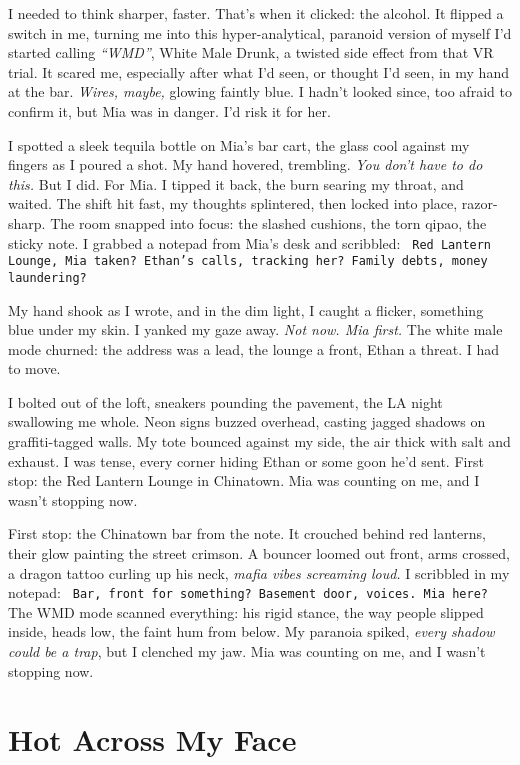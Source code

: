 \documentclass[12pt]{article}
\newcommand{\note}[1]{\texttt{\small \color{DarkGray} #1}}
\begin{document}
I needed to think sharper, faster. That’s when it clicked: the alcohol. It flipped a switch in me, turning me into this hyper-analytical, paranoid version of myself I’d started calling \textit{“WMD”}, White Male Drunk, a twisted side effect from that VR trial. It scared me, especially after what I’d seen, or thought I’d seen, in my hand at the bar. \textit{Wires, maybe,} glowing faintly blue. I hadn’t looked since, too afraid to confirm it, but \textnormal{Mia} was in danger. I’d risk it for her.

I spotted a sleek tequila bottle on \textnormal{Mia}’s bar cart, the glass cool against my fingers as I poured a shot. My hand hovered, trembling. \textit{You don’t have to do this.} But I did. For \textnormal{Mia}. I tipped it back, the burn searing my throat, and waited. The shift hit fast, my thoughts splintered, then locked into place, razor-sharp. The room snapped into focus: the slashed cushions, the torn qipao, the sticky note. I grabbed a notepad from \textnormal{Mia}’s desk and scribbled: \note{Red Lantern Lounge, Mia taken? Ethan’s calls, tracking her? Family debts, money laundering?}

My hand shook as I wrote, and in the dim light, I caught a flicker, something blue under my skin. I yanked my gaze away. \textit{Not now. Mia first.} The white male mode churned: the address was a lead, the lounge a front, \textnormal{Ethan} a threat. I had to move.

I bolted out of the loft, sneakers pounding the pavement, the LA night swallowing me whole. Neon signs buzzed overhead, casting jagged shadows on graffiti-tagged walls. My tote bounced against my side, the air thick with salt and exhaust. I was tense, every corner hiding \textnormal{Ethan} or some goon he’d sent. First stop: the Red Lantern Lounge in Chinatown. \textnormal{Mia} was counting on me, and I wasn’t stopping now.

First stop: the Chinatown bar from the note. It crouched behind red lanterns, their glow painting the street crimson. A bouncer loomed out front, arms crossed, a dragon tattoo curling up his neck, \textit{mafia vibes screaming loud.} I scribbled in my notepad: \note{Bar, front for something? Basement door, voices. Mia here?} The WMD mode scanned everything: his rigid stance, the way people slipped inside, heads low, the faint hum from below. My paranoia spiked, \textit{every shadow could be a trap}, but I clenched my jaw. \textnormal{Mia} was counting on me, and I wasn’t stopping now.

\section{Hot Across My Face}
\end{document}
